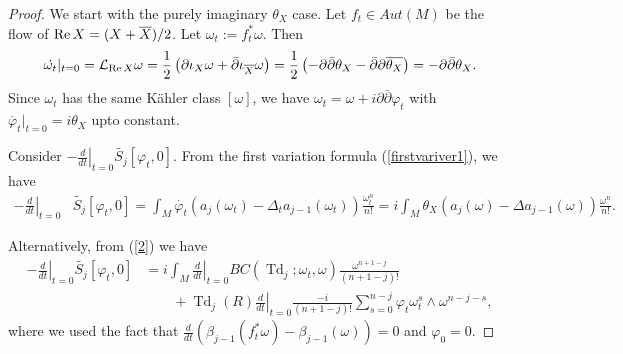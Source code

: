 \documentclass[12pt,reqno,a4paper]{amsart}
\numberwithin{equation}{section}
\def\p{\partial}
\def\bp{\bar\partial}
\def\b{\beta}
\DeclareMathOperator{\Td}{Td}
\def\re{{\rm Re\,}}
\theoremstyle{remark}
\theoremstyle{dotless}
\begin{document}
\begin{proof}
We start with the purely imaginary $\theta_X$ case. Let $f_t \in Aut(M)$ be the flow of $\re X=(X+\overline{X})/2$. Let $\omega_t:=f_t^*\omega$. Then
\begin{equation}\label{lie}
\dot{\omega_t}|_{t=0}=\mathcal{L}_{\re X}\omega=\frac{1}{2}\left(\p\iota_X \omega +\bp\iota_{\overline{X}}\omega\right)=\frac{1}{2}\left(-\p\bp\theta_X-\bp\p\overline{\theta_X}\right)=-\p\bp\theta_X.
\end{equation}
Since $\omega_t$ has the same K\"ahler class $[\omega]$, we have $\omega_t=\omega+i\p\bp\varphi_t$  with
$\dot{\varphi_t}|_{t=0}=i\theta_X$ upto constant.

Consider $\left.-\frac{d}{dt}\right|_{t=0}\widetilde{S_j}[\varphi_t,0]$. From the first variation formula (\ref{firstvariver1}), we have
\begin{align}\label{integrates}
\left.-\frac{d}{dt}\right|_{t=0}&\widetilde{S_j}[\varphi_t,0]=\int_M \dot{\varphi_t}\left( a_j(\omega_t)-\Delta_t a_{j-1}(\omega_t) \right) \frac{\omega_t^n}{n!}=i\int_M \theta_X\left( a_j(\omega)-\Delta a_{j-1}(\omega) \right) \frac{\omega^n}{n!}. 
\end{align}


Alternatively, from (\ref{2}) we have
\begin{align*}
\left.-\frac{d}{dt}\right|_{t=0}\widetilde{S_j}[\varphi_t,0]&=i\int_M \left.\frac{d}{dt}\right|_{t=0}BC(\Td_j;\omega_t,\omega)\frac{\omega^{n+1-j}}{(n+1-j)!}\nonumber\\
&\qquad+\Td_{j}(R)\left.\frac{d}{dt}\right|_{t=0}\frac{-i}{(n+1-j)!}\sum^{n-j}_{s=0}\varphi_t \omega_{t}^s\wedge \omega^{n-j-s},
\end{align*}
where we used the fact that $\frac{d}{dt}\left(\b_{j-1}(f_t^*\omega)-\b_{j-1}(\omega)\right)=0$ and $\varphi_0=0$. 


\end{proof}
\end{document}
